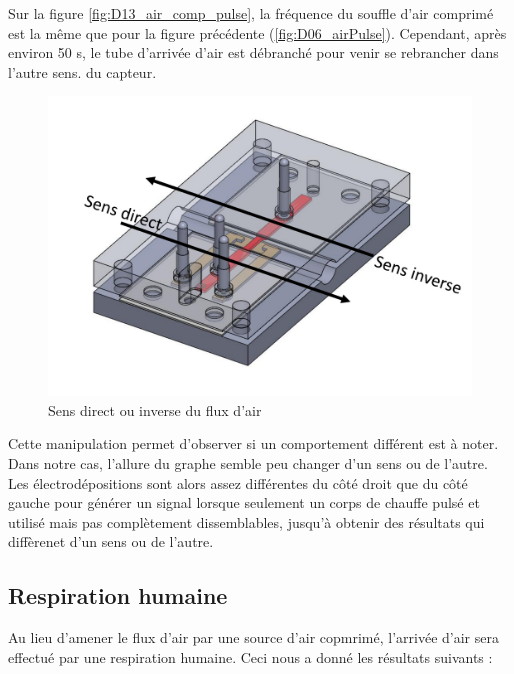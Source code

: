 Sur la figure \ref{fig:D13_air_comp_pulse}, la fréquence du souffle d'air comprimé est la même que pour la figure précédente 
(\ref{fig:D06_airPulse}). Cependant, après environ 50 s, le tube d'arrivée d'air est débranché pour venir se rebrancher dans l'autre sens. 
du capteur. 

\begin{figure}[H]
    \centering
    \includegraphics[scale = 0.3]{assets/figures/Inverse_direct.pdf}
    \caption{Sens direct ou inverse du flux d'air}
    \label{fig:direct_inverse}
\end{figure}

Cette manipulation permet d'observer si un comportement différent est à noter. Dans notre cas, l'allure du graphe semble peu changer d'un sens 
ou de l'autre. Les électrodépositions sont alors assez différentes du côté droit que du côté gauche pour générer un signal lorsque seulement un 
corps de chauffe pulsé et utilisé mais pas complètement dissemblables, jusqu'à obtenir des résultats qui diffèrenet d'un sens ou de l'autre. 

\subsection{Respiration humaine}
Au lieu d'amener le flux d'air par une source d'air copmrimé, l'arrivée d'air sera effectué par une respiration humaine. Ceci nous a donné les résultats suivants :

